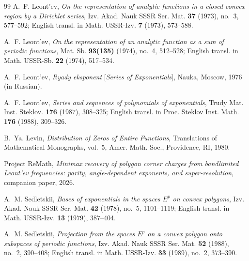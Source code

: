 \documentclass[11pt,reqno]{amsart}
\theoremstyle{definition}
\theoremstyle{remark}
\begin{document}
\begin{thebibliography}{99}
A.~F. Leont'ev, \emph{On the representation of analytic functions in a closed convex region by a Dirichlet series}, Izv. Akad. Nauk SSSR Ser. Mat. \textbf{37} (1973), no.~3, 577--592; English transl. in Math. USSR-Izv. \textbf{7} (1973), 573--588.

A.~F. Leont'ev, \emph{On the representation of an analytic function as a sum of periodic functions}, Mat. Sb. \textbf{93(135)} (1974), no.~4, 512--528; English transl. in Math. USSR-Sb. \textbf{22} (1974), 517--534.

A.~F. Leont'ev, \emph{Ryady eksponent} [\emph{Series of Exponentials}], Nauka, Moscow, 1976 (in Russian).

A.~F. Leont'ev, \emph{Series and sequences of polynomials of exponentials}, Trudy Mat. Inst. Steklov. \textbf{176} (1987), 308--325; English transl. in Proc. Steklov Inst. Math. \textbf{176} (1988), 309--326.

B.~Ya. Levin, \emph{Distribution of Zeros of Entire Functions}, Translations of Mathematical Monographs, vol.~5, Amer. Math. Soc., Providence, RI, 1980.

Project ReMath, \emph{Minimax recovery of polygon corner charges from bandlimited Leont'ev frequencies: parity, angle-dependent exponents, and super-resolution}, companion paper, 2026.

A.~M. Sedletskii, \emph{Bases of exponentials in the spaces $E^p$ on convex polygons}, Izv. Akad. Nauk SSSR Ser. Mat. \textbf{42} (1978), no.~5, 1101--1119; English transl. in Math. USSR-Izv. \textbf{13} (1979), 387--404.

A.~M. Sedletskii, \emph{Projection from the spaces $E^p$ on a convex polygon onto subspaces of periodic functions}, Izv. Akad. Nauk SSSR Ser. Mat. \textbf{52} (1988), no.~2, 390--408; English transl. in Math. USSR-Izv. \textbf{33} (1989), no.~2, 373--390.

\end{thebibliography}
\end{document}
